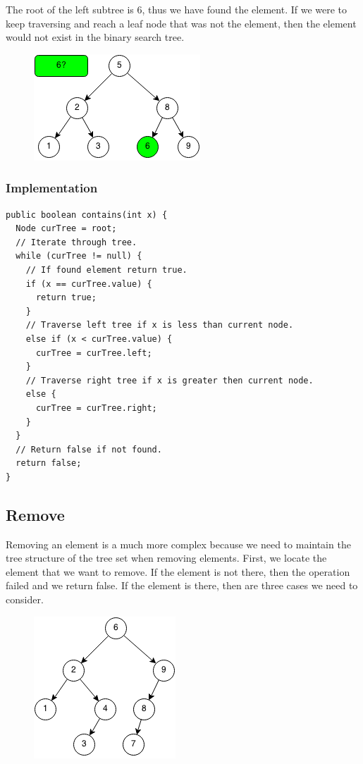 \documentclass[11pt,oneside]{book}
\makeatletter
\def\maxwidth#1{\ifdim\Gin@nat@width>#1 #1\else\Gin@nat@width\fi}
\makeatother
\begin{document}
The root of the left subtree is 6, thus we have found the element. If we were to keep traversing and reach a leaf node that was not the element, then the element would not exist in the binary search tree.

\vspace{5px}\begin{figure}[H]\centering
        \includegraphics[width=0.66\maxwidth{\textwidth}]{bstcontains4.png}
        \end{figure}

\subsubsection{Implementation}

\begin{lstlisting}
public boolean contains(int x) {
  Node curTree = root;
  // Iterate through tree.
  while (curTree != null) {
    // If found element return true.
    if (x == curTree.value) {
      return true;
    }
    // Traverse left tree if x is less than current node.
    else if (x < curTree.value) {
      curTree = curTree.left;
    }
    // Traverse right tree if x is greater then current node.
    else {
      curTree = curTree.right;
    }
  }
  // Return false if not found.
  return false;
}
\end{lstlisting}

\subsection{Remove}

Removing an element is a much more complex because we need to maintain the tree structure of the tree set when removing elements. First, we locate the element that we want to remove. If the element is not there, then the operation failed and we return false. If the element is there, then are three cases we need to consider.

\vspace{5px}\begin{figure}[H]\centering
        \includegraphics[width=0.66\maxwidth{\textwidth}]{bst-rem.png}
        \end{figure}
\end{document}
